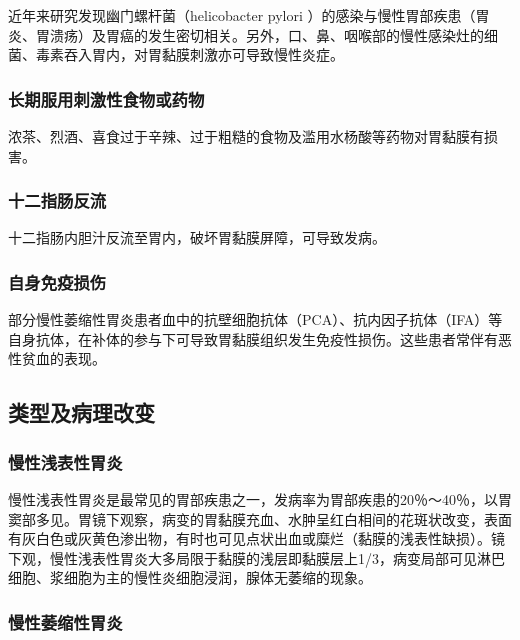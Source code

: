 近年来研究发现幽门螺杆菌（{helicobacter pylori}
）的感染与慢性胃部疾患（胃炎、胃溃疡）及胃癌的发生密切相关。另外，口、鼻、咽喉部的慢性感染灶的细菌、毒素吞入胃内，对胃黏膜刺激亦可导致慢性炎症。

\subsubsection{长期服用刺激性食物或药物}

浓茶、烈酒、喜食过于辛辣、过于粗糙的食物及滥用水杨酸等药物对胃黏膜有损害。

\subsubsection{十二指肠反流}

十二指肠内胆汁反流至胃内，破坏胃黏膜屏障，可导致发病。

\subsubsection{自身免疫损伤}

部分慢性萎缩性胃炎患者血中的抗壁细胞抗体（PCA）、抗内因子抗体（IFA）等自身抗体，在补体的参与下可导致胃黏膜组织发生免疫性损伤。这些患者常伴有恶性贫血的表现。

\subsection{类型及病理改变}

\subsubsection{慢性浅表性胃炎}

慢性浅表性胃炎是最常见的胃部疾患之一，发病率为胃部疾患的20％～40％，以胃窦部多见。胃镜下观察，病变的胃黏膜充血、水肿呈红白相间的花斑状改变，表面有灰白色或灰黄色渗出物，有时也可见点状出血或糜烂（黏膜的浅表性缺损）。镜下观，慢性浅表性胃炎大多局限于黏膜的浅层即黏膜层上1/3，病变局部可见淋巴细胞、浆细胞为主的慢性炎细胞浸润，腺体无萎缩的现象。

\subsubsection{慢性萎缩性胃炎}

